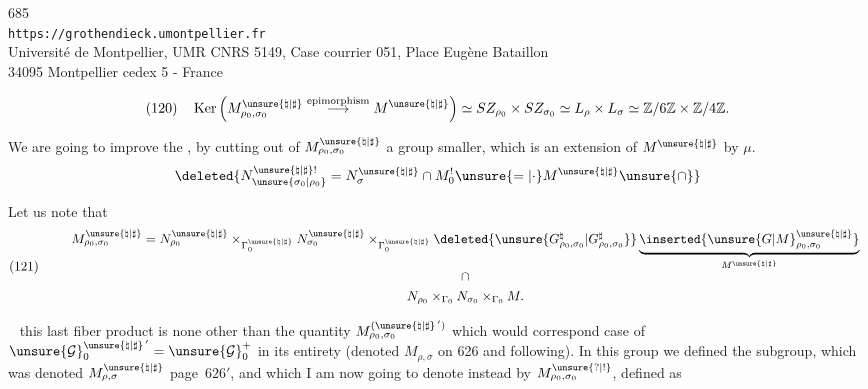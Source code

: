 \begin{center}
685\\
\texttt{https://grothendieck.umontpellier.fr}\\
Université de Montpellier, UMR CNRS 5149, Case courrier 051, Place Eugène Bataillon\\
34095 Montpellier cedex 5 - France
\end{center}



\[
(120)\quad
\operatorname{Ker}\left(
M_{\rho_0,\sigma_0}^{\unsure{\natural|\sharp}}
\overset{\text{epimorphism}}{\longrightarrow}M^{\unsure{\natural|\sharp}}
\right)
\simeq SZ_{\rho_0}\times SZ_{\sigma_0}
\simeq L_\rho\times L_\sigma
\simeq \mathbb Z/6\mathbb Z\times\mathbb Z/4\mathbb Z .
\]

We are going to improve  the ,
by cutting out of $M_{\rho_0,\sigma_0}^{\unsure{\natural|\sharp}}$
a group  smaller, which is an extension of
$M^{\unsure{\natural|\sharp}}$ by $\mu$.
\[
\deleted{
N_{\unsure{\sigma_0|\rho_0}}^{\unsure{\natural|\sharp}!}
=N_{\sigma}^{\unsure{\natural|\sharp}}\cap M_0^!
\unsure{=|\cdot}M^{\unsure{\natural|\sharp}}\unsure{\cap}
}
\]

\unsure{(}

Let us note that
\[
(121)\qquad
\begin{array}{c}
M_{\rho_0,\sigma_0}^{\unsure{\natural|\sharp}}
=N_{\rho_0}^{\unsure{\natural|\sharp}}
\times_{\Gamma_0^{\unsure{\natural|\sharp}}}
N_{\sigma_0}^{\unsure{\natural|\sharp}}
\times_{\Gamma_0^{\unsure{\natural|\sharp}}}
\deleted{\unsure{G_{\rho_0,\sigma_0}^{\natural}|G_{\rho_0,\sigma_0}^{\sharp}}}
\underbrace{\inserted{\unsure{G|M}_{\rho_0,\sigma_0}^{\unsure{\natural|\sharp}}}}
 _{M^{\unsure{\natural|\sharp}}}\\[5pt]
\cap\\[3pt]
N_{\rho_0}\times_{\Gamma_0}N_{\sigma_0}\times_{\Gamma_0}M .
\end{array}
\]

\  this last fiber product is none other than the
quantity $M_{\rho_0,\sigma_0}^{(\unsure{\natural|\sharp}\,')}$
which would correspond  case
of $\unsure{\mathcal G}_0^{\unsure{\natural|\sharp}\,'}
=\unsure{\mathcal G}_0^+$ in  its entirety
(denoted $M_{\rho,\sigma}$ on  626 and following).
In this group we defined the subgroup, which was denoted
$M_{\rho,\sigma}^{\unsure{\natural|\sharp}}$
 page\ $626'$,
and which I am now going to denote instead by
$M_{\rho_0,\sigma_0}^{\unsure{?|!}}$, defined as

